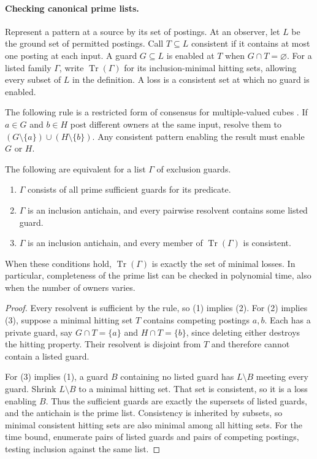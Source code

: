 \paragraph{Checking canonical prime lists.}
Represent a pattern at a source by its set of postings. At an observer,
let $L$ be the ground set of permitted postings. Call $T\subseteq L$
consistent if it contains at most one posting at each input. A guard
$G\subseteq L$ is enabled at $T$ when $G\cap T=\varnothing$. For a
listed family $\Gamma$, write $\operatorname{Tr}(\Gamma)$ for its
inclusion-minimal hitting sets, allowing every subset of $L$ in the
definition. A loss is a consistent set at which no guard is enabled.

The following rule is a restricted form of consensus for
multiple-valued cubes \cite[Sec.~II]{RudellSangiovanniVincentelli1987}.
If $a\in G$ and $b\in H$ post different owners at the same input,
resolve them to $(G\setminus\{a\})\cup(H\setminus\{b\})$. Any
consistent pattern enabling the result must enable $G$ or $H$.

\begin{theorem}\label{core:thm:guard-consensus}
The following are equivalent for a list $\Gamma$ of exclusion guards.
\begin{enumerate}
\item $\Gamma$ consists of all prime sufficient guards for its predicate.
\item $\Gamma$ is an inclusion antichain, and every pairwise resolvent
contains some listed guard.
\item $\Gamma$ is an inclusion antichain, and every member of
$\operatorname{Tr}(\Gamma)$ is consistent.
\end{enumerate}
When these conditions hold, $\operatorname{Tr}(\Gamma)$ is exactly the
set of minimal losses. In particular, completeness of the prime list
can be checked in polynomial time, also when the number of owners varies.
\end{theorem}
\begin{proof}
Every resolvent is sufficient by the rule, so (1) implies (2).
For (2) implies (3), suppose a minimal hitting set $T$ contains competing
postings $a,b$. Each has a private guard, say $G\cap T=\{a\}$ and
$H\cap T=\{b\}$, since deleting either destroys the hitting property.
Their resolvent is disjoint from $T$ and therefore cannot contain a
listed guard.

For (3) implies (1), a guard $B$ containing no listed guard has
$L\setminus B$ meeting every guard. Shrink $L\setminus B$ to a minimal
hitting set. That set is consistent, so it is a loss enabling $B$.
Thus the sufficient guards are exactly the supersets of listed
guards, and the antichain is the prime list. Consistency is inherited
by subsets, so minimal consistent hitting sets are also minimal among
all hitting sets. For the time bound, enumerate pairs of listed guards
and pairs of competing postings, testing inclusion against the same list.
\end{proof}

